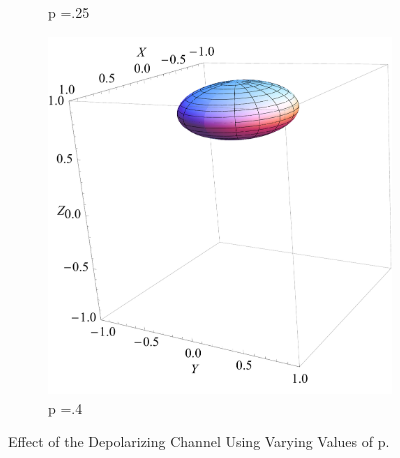 \documentclass[letterpaper,twoside,10pt]{article}
\begin{document}
\begin{figure}[H]
\begin{subfigure}{.3\textwidth}
		\caption{p =.25}%
	\end{subfigure}
	\begin{subfigure}{.3\textwidth}
		\includegraphics[width=\columnwidth,natwidth=600,natheight=600]{./AmplitudeDamping/ADPoint8.pdf}%
		\caption{p =.4}%
	\end{subfigure}
	\caption{Effect of the Depolarizing Channel Using Varying Values of p.}
\end{figure}






\nocite{*} %
\end{document}
